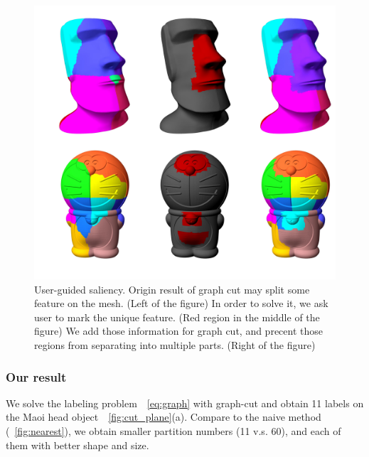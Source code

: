\begin{figure}[ht]
\centering
\includegraphics[width=1.0\linewidth]{figs/saliency.pdf} 
\caption{User-guided saliency. 
Origin result of graph cut may split some feature on the mesh. (Left of the figure) In order to solve it, we ask user to mark the unique feature. (Red region in the middle of the figure) We add those information for graph cut, and precent those regions from separating into multiple parts. (Right of the figure)} 
\label{fig:saliency}
\end{figure}

\subsubsection{Our result}
We solve the labeling problem~\eqname~\ref{eq:graph} with graph-cut and obtain 11 labels on the Maoi head object~\figname~\ref{fig:cut_plane}(a).
Compare to the naive method (\figname~\ref{fig:nearest}), we obtain  smaller partition numbers (11 v.s. 60), and each of them  with better shape and size.

